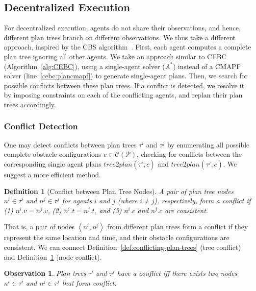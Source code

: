 \documentclass[letterpaper]{article} %
\newcommand{\toplan}{\textit{tree2plan}}
\newcommand{\tuple}[1]{\ensuremath{\left \langle #1 \right \rangle }}
\newcommand{\roni}[1]{{\textcolor{green}{[Roni: #1]}}}
\newtheorem{observation}{Observation}
\newtheorem{definition}{Definition}
\begin{document}
\subsection{Decentralized Execution}
\label{scn:decentralized}

For decentralized execution, agents do not share their observations, and hence, different plan trees branch on different observations. 
We thus take a different approach, inspired by the CBS algorithm~\cite{sharon2015conflict}. 
First, each agent computes a complete plan tree ignoring all other agents. We take an approach similar to CEBC (Algorithm~\ref{alg:CEBC}), using a single-agent solver ($A^*$) instead of a CMAPF solver (line~\ref{cebc:plancmapf}) to generate single-agent plans.
Then, we search for possible conflicts between these plan trees. 
If a conflict is detected, we resolve it by imposing 
constraints on each of the conflicting agents, and replan their plan trees accordingly. 


\subsubsection{Conflict Detection}
\label{scn:conflicts}
One may detect conflicts between plan trees $\tau^i$ and $\tau^j$ by enumerating all possible complete obstacle configurations $c\in\mathcal{C}(\mathcal{P})$, checking for conflicts between the corresponding single agent plans $\toplan(\tau^i,c)$ and $\toplan(\tau^j,c)$. 
We suggest a more efficient method. 
\begin{definition}[Conflict between Plan Tree Nodes]
A pair of plan tree nodes $n^i\in\tau^i$ and $n^j\in\tau^j$ for agents $i$ and $j$ (where $i\neq j$), respectively, form a conflict if 
(1) $n^i.v = n^j.v$, 
(2) $n^i.t = n^j.t$, 
and (3) $n^i.c$ and $n^j.c$ are consistent.
\label{def:mapfou-conflict}
\end{definition}
That is, a pair of nodes $\tuple{n^i,n^j}$ from different plan trees form a conflict if they represent the same location and time, and their obstacle configurations are consistent.  
We can connect Definition~\ref{def:conflicting-plan-trees} (tree conflict) and  Definition~\ref{def:mapfou-conflict} (node conflict).  
\begin{observation}
Plan trees $\tau^i$ and $\tau^j$ have a conflict 
iff there exists two nodes $n^i\in\tau^i$ and $n^j\in\tau^j$ that form conflict. 
\label{obs:conditionsForConflicts}
\end{observation} 
\end{document}
